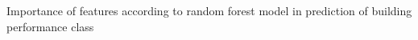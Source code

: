 Importance of features according to random forest model in prediction of building performance class
\label{sec:featureimportance_performclass}